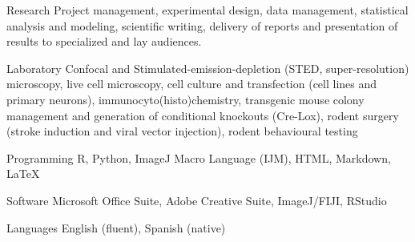 

\begin{cvskills}

  \cvskill
    {Research} %
    {Project management, experimental design, data management, statistical analysis and modeling, scientific writing, delivery of reports and presentation of results to specialized and lay audiences.} %

  \cvskill
    {Laboratory} %
    {Confocal and Stimulated-emission-depletion (STED, super-resolution) microscopy, live cell microscopy, cell culture and transfection (cell lines and primary neurons), immunocyto(histo)chemistry, transgenic mouse colony management and generation of conditional knockouts (Cre-Lox), rodent surgery (stroke induction and viral vector injection), rodent behavioural testing} %

  \cvskill
    {Programming} %
    {R, Python, ImageJ Macro Language (IJM), HTML, Markdown, \LaTeX} %

  \cvskill
    {Software} %
    {Microsoft Office Suite, Adobe Creative Suite, ImageJ/FIJI, RStudio} %

  \cvskill
    {Languages} %
    {English (fluent), Spanish (native)} %

  
\end{cvskills}
